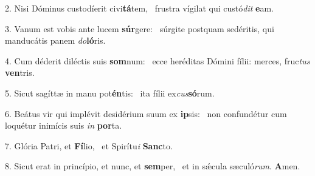 2. Nisi Dóminus custodíerit civi\textbf{tá}tem, \ast\  frustra vígilat qui custó\textit{dit} \textbf{e}am.\

3. Vanum est vobis ante lucem \textbf{súr}gere: \ast\  súrgite postquam sedéritis, qui manducátis panem \textit{do}\textbf{ló}ris.\

4. Cum déderit diléctis suis \textbf{som}num: \ast\  ecce heréditas Dómini fílii: merces, fruc\textit{tus} \textbf{ven}tris.\

5. Sicut sagíttæ in manu pot\textbf{én}tis: \ast\  ita fílii ex\textit{cus}\textbf{só}rum.\

6. Beátus vir qui implévit desidérium suum ex \textbf{ip}sis: \ast\  non confundétur cum loquétur inimícis suis \textit{in} \textbf{por}ta.\

7. Glória Patri, et \textbf{Fí}lio, \ast\  et Spirítu\textit{i} \textbf{Sanc}to.\

8. Sicut erat in princípio, et nunc, et \textbf{sem}per, \ast\  et in sǽcula sæculó\textit{rum}. \textbf{A}men.\

